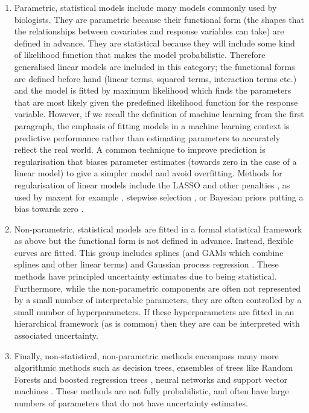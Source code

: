 \documentclass[10pt,]{article}
\begin{document}
\begin{enumerate}
\def\labelenumi{\roman{enumi})}
\item
  Parametric, statistical models include many models commonly used by biologists. They are parametric because their functional form (the shapes that the relationships between covariates and response variables can take) are defined in advance. They are statistical because they will include some kind of likelihood function that makes the model probabilistic. Therefore generalised linear models are included in this category; the functional forms are defined before hand (linear terms, squared terms, interaction terms etc.) and the model is fitted by maximum likelihood which finds the parameters that are most likely given the predefined likelihood function for the response variable. However, if we recall the definition of machine learning from the first paragraph, the emphasis of fitting models in a machine learning context is predictive performance rather than estimating parameters to accurately reflect the real world. A common technique to improve prediction is regularisation that biases parameter estimates (towards zero in the case of a linear model) to give a simpler model and avoid overfitting. Methods for regularisation of linear models include the LASSO and other penalties \citep{tibshirani1996regression, zou2005regularization, xu2017generalized, fan2001variable}, as used by maxent for example \citep{maxent}, stepwise selection \citep{hocking1976biometrics}, or Bayesian priors putting a bias towards zero \citep{park2008bayesian, liu2018bayesian, carvalho2009handling}.
\item
  Non-parametric, statistical models are fitted in a formal statistical framework as above but the functional form is not defined in advance. Instead, flexible curves are fitted. This group includes splines (and GAMs which combine splines and other linear terms) and Gaussian process regression \citep{rasmussen2004gaussian}. These methods have principled uncertainty estimates due to being statistical. Furthermore, while the non-parametric components are often not represented by a small number of interpretable parameters, they are often controlled by a small number of hyperparameters. If these hyperparameters are fitted in an hierarchical framework (as is common) then they are can be interpreted with associated uncertainty.
\item
  Finally, non-statistical, non-parametric methods encompass many more algorithmic methods \citep{crisci2012review} such as decision trees, ensembles of trees like Random Forests \citep{breiman2001random} and boosted regression trees \citep{elith2008working, friedman2001greedy}, neural networks \citep{neuralnets} and support vector machines \citep{svm}. These methods are not fully probabilistic, and often have large numbers of parameters that do not have uncertainty estimates.
\end{enumerate}
\end{document}
